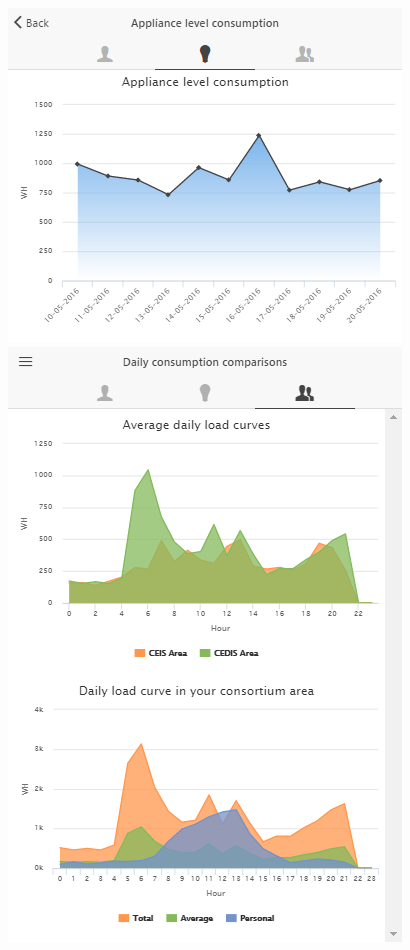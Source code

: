 \begin{figure}
      \begin{center}
        \begin{minipage}[htb]{0.54\linewidth}    
        \includegraphics[width=1\linewidth]{img/applianceconsumption.png}
        \end{minipage}
	\hfill 
        \begin{minipage}[htb]{0.44\linewidth}    
         \includegraphics[width=1\linewidth]{img/benchmark.png}

\end{minipage}
\end{center}
\end{figure}

